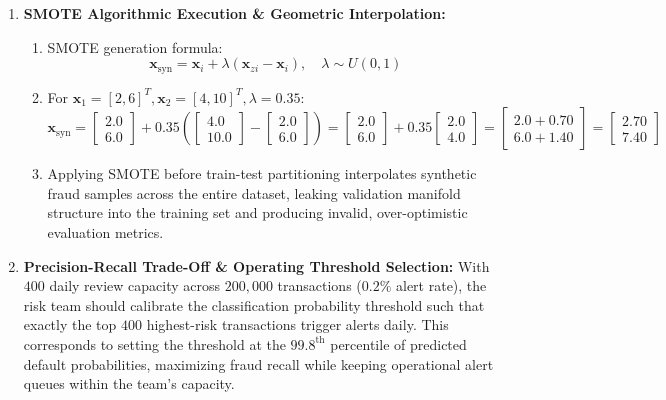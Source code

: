 \begin{enumerate}[label=\textbf{P9.\arabic*}]
    \item \textbf{SMOTE Algorithmic Execution \& Geometric Interpolation:}
    \begin{enumerate}[label=(\alph*)]
        \item SMOTE generation formula:
        \begin{equation*}
        \mathbf{x}_{\text{syn}} = \mathbf{x}_i + \lambda (\mathbf{x}_{zi} - \mathbf{x}_i), \quad \lambda \sim U(0, 1)
        \end{equation*}
        \item For $\mathbf{x}_1 = [2, 6]^T, \mathbf{x}_2 = [4, 10]^T, \lambda = 0.35$:
        \begin{equation*}
        \mathbf{x}_{\text{syn}} = \begin{bmatrix} 2.0 \\ 6.0 \end{bmatrix} + 0.35 \left( \begin{bmatrix} 4.0 \\ 10.0 \end{bmatrix} - \begin{bmatrix} 2.0 \\ 6.0 \end{bmatrix} \right) = \begin{bmatrix} 2.0 \\ 6.0 \end{bmatrix} + 0.35 \begin{bmatrix} 2.0 \\ 4.0 \end{bmatrix} = \begin{bmatrix} 2.0 + 0.70 \\ 6.0 + 1.40 \end{bmatrix} = \mathbf{\begin{bmatrix} 2.70 \\ 7.40 \end{bmatrix}}
        \end{equation*}
        \item Applying SMOTE before train-test partitioning interpolates synthetic fraud samples across the entire dataset, leaking validation manifold structure into the training set and producing invalid, over-optimistic evaluation metrics.
    \end{enumerate}

    \item \textbf{Precision-Recall Trade-Off \& Operating Threshold Selection:}
    With $400$ daily review capacity across $200{,}000$ transactions ($0.2\%$ alert rate), the risk team should calibrate the classification probability threshold such that exactly the top $400$ highest-risk transactions trigger alerts daily. This corresponds to setting the threshold at the $99.8^{\text{th}}$ percentile of predicted default probabilities, maximizing fraud recall while keeping operational alert queues within the team's capacity.


\end{enumerate}
